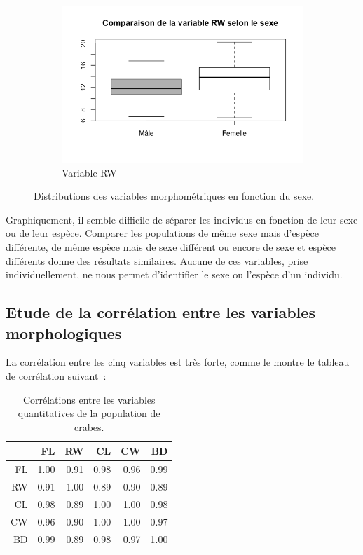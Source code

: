 \documentclass[a4paper,11pt]{report}
\begin{document}
\begin{figure}[H]
\begin{subfigure}[b]{0.3\linewidth}
		\includegraphics[width=1\linewidth]{img/1-2-1-sex-rw.png}
		\caption{\scriptsize Variable RW}
		\label{fig:1_2_1_sex_rw}
	\end{subfigure}%
	\caption{
		\small Distributions des variables morphométriques en fonction du sexe.
	}
	\label{fig:morphemetriques_en_fonction_sexe}%
\end{figure}

Graphiquement, il semble difficile de séparer les individus en fonction de leur sexe ou de leur espèce. Comparer les populations de même sexe mais d'espèce différente, de même espèce mais de sexe différent ou encore de sexe et espèce différents donne des résultats similaires. Aucune de ces variables, prise individuellement, ne nous permet d'identifier le sexe ou l'espèce d'un individu.

\subsection{Etude de la corrélation entre les variables morphologiques}
\label{subsection:crabs_correlation_variables_quantitatives}

La corrélation entre les cinq variables est très forte, comme le montre le tableau de corrélation suivant~:
\newpage
\begin{table}[h]
	\centering
	\captionsetup{justification=centering, margin=2cm}
	\caption{Corrélations entre les variables quantitatives de la population de crabes.}
	\begin{tabular}{rrrrrr}
		\hline
		& FL & RW & CL & CW & BD \\ 
		\hline
		FL & 1.00 & 0.91 & 0.98 & 0.96 & 0.99 \\ 
		RW & 0.91 & 1.00 & 0.89 & 0.90 & 0.89 \\ 
		CL & 0.98 & 0.89 & 1.00 & 1.00 & 0.98 \\ 
		CW & 0.96 & 0.90 & 1.00 & 1.00 & 0.97 \\ 
		BD & 0.99 & 0.89 & 0.98 & 0.97 & 1.00 \\ 
		\hline
	\end{tabular}
\end{table}
\end{document}
